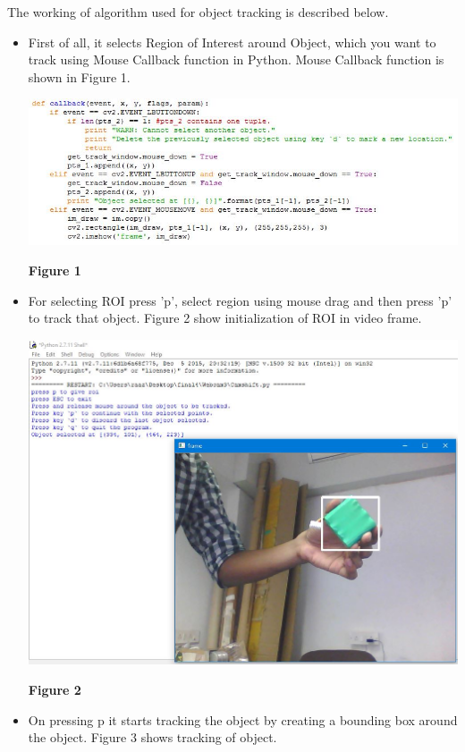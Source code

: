 \documentclass[11pt,a4paper]{article}
\begin{document}
		 The working of algorithm used for object tracking is described below.
		 \begin{itemize}
		 	\item First of all, it selects Region of Interest around Object, which you want to track using Mouse Callback function in Python. Mouse Callback function is shown in Figure 1.
			 	\begin{center}
			 		\includegraphics[scale=0.7]{Image4.JPG}
			 	\end{center}
			 	\begin{center}
			 		\textbf{Figure 1}
			 	\end{center}
		 	\item For selecting ROI press 'p', select region using mouse drag and then press 'p' to track that object. Figure 2 show initialization of ROI in video frame.
			 	\begin{center}
			 		\includegraphics[scale=0.5]{giving_roi.JPG}
			 	\end{center}
			 	\begin{center}
			 		\textbf{Figure 2}
			 	\end{center}
		 	\item On pressing p it starts tracking the object by creating a bounding box around the object. Figure 3 shows tracking of object.

\end{itemize}
\end{document}

